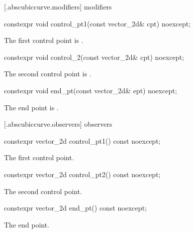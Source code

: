  [\iotwod.abscubiccurve.modifiers]{ modifiers}

%
\begin{itemdecl}
constexpr void control_pt1(const vector_2d& cpt) noexcept;
\end{itemdecl}
\begin{itemdescr}
\pnum
\effects
The first control point is .
\end{itemdescr}

%
\begin{itemdecl}
constexpr void control_2(const vector_2d& cpt) noexcept;
\end{itemdecl}
\begin{itemdescr}
\pnum
\effects
The second control point is .
\end{itemdescr}

%
\begin{itemdecl}
constexpr void end_pt(const vector_2d& ept) noexcept;
\end{itemdecl}
\begin{itemdescr}
\pnum
\effects
The end point is .
\end{itemdescr}

 [\iotwod.abscubiccurve.observers]{ observers}

%
\begin{itemdecl}
constexpr vector_2d control_pt1() const noexcept;
\end{itemdecl}
\begin{itemdescr}
\pnum
\returns
The first control point.
\end{itemdescr}

%
\begin{itemdecl}
constexpr vector_2d control_pt2() const noexcept;
\end{itemdecl}
\begin{itemdescr}
\pnum
\returns
The second control point.
\end{itemdescr}

%
\begin{itemdecl}
constexpr vector_2d end_pt() const noexcept;
\end{itemdecl}
\begin{itemdescr}
\pnum
\returns
The end point.
\end{itemdescr}

